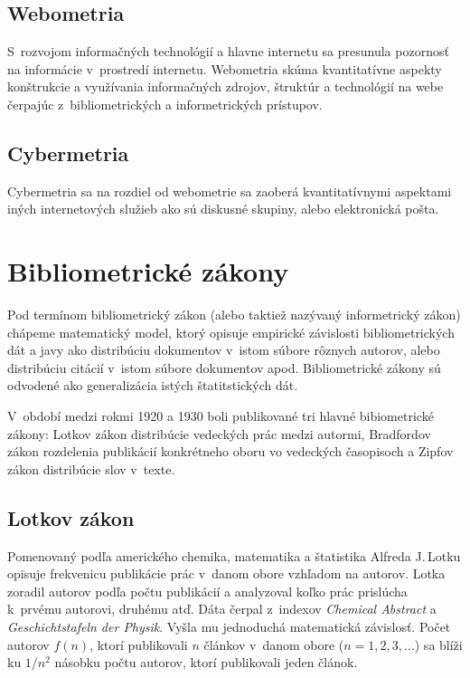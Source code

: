 \subsection{Webometria}

S~rozvojom informačných technológií a hlavne internetu sa presunula pozornosť na
informácie v~prostredí internetu.  Webometria skúma kvantitatívne aspekty
konštrukcie a využívania informačných zdrojov, štruktúr a technológií na webe
čerpajúc z~bibliometrických a informetrických prístupov.


\subsection{Cybermetria}

Cybermetria sa na rozdiel od webometrie sa zaoberá kvantitatívnymi aspektami
iných internetových služieb ako sú diskusné skupiny, alebo elektronická pošta.


\section{Bibliometrické zákony}

Pod termínom bibliometrický zákon (alebo taktiež nazývaný informetrický zákon)
chápeme matematický model, ktorý opisuje empirické závislosti bibliometrických
dát a javy ako distribúciu dokumentov v~istom súbore rôznych autorov, alebo
distribúciu citácií v~istom súbore dokumentov apod.  Bibliometrické zákony sú
odvodené ako generalizácia istých štatitstických dát. \citep{Todeschini2016}

V~období medzi rokmi 1920 a 1930 boli publikované tri hlavné bibiometrické
zákony: Lotkov zákon distribúcie vedeckých prác medzi autormi, Bradfordov zákon
rozdelenia publikácií konkrétneho oboru vo vedeckých časopisoch a Zipfov
zákon
distribúcie slov v~texte. \citep{Bellis2009}


\subsection{Lotkov zákon}

Pomenovaný podľa amerického chemika, matematika a štatistika Alfreda J.\,Lotku
opisuje frekvenicu publikácie prác v~danom obore vzhľadom na autorov.  Lotka
zoradil autorov podľa počtu publikácií a analyzoval koľko prác prislúcha
k~prvému autorovi, druhému atď.  Dáta čerpal z~indexov \emph{Chemical Abstract}
a \emph{Geschichtstafeln der Physik}. \citep{Lotka1926}  Vyšla mu jednoduchá
matematická závislosť.  Počet autorov $f(n)$, ktorí publikovali $n$ článkov
v~danom obore ($n = 1, 2, 3, \dots$) sa blíži ku $1/n^2$ násobku počtu autorov,
ktorí publikovali jeden článok.

